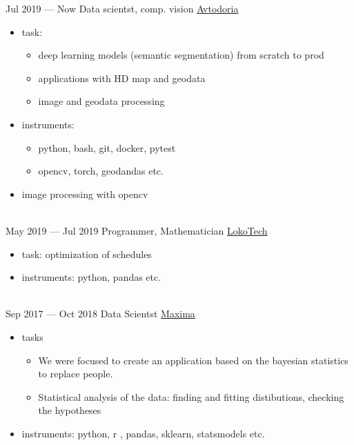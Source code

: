 \documentclass[letterpaper]{twentysecondcv} %
\begin{document}
\begin{twenty} %
        \twentyitem
        {Jul 2019 —}
        {Now}
        {Data scientst, comp. vision}
        {  \href{https://avtodoria.ru/}{Avtodoria}}
        {}
        {
        {\begin{itemize}
            \item task:
            {\begin{itemize}
                \item deep learning models (semantic segmentation) from scratch to prod
                \item applications with HD map and geodata
                \item image and geodata processing
            \end{itemize}}
            \item instruments:
            {\begin{itemize}
                \item python, bash, git, docker, pytest
                \item opencv, torch, geodandas etc.
            \end{itemize}
            }

            \item image processing with opencv
        \end{itemize}}
        }
        \\
        \twentyitem
        {May 2019 —}
        {Jul 2019}
        {Programmer, Mathematician}
        {\href{http://www.locotech.ru/}{LokoTech}}
        {}
        {
        {\begin{itemize}
            \item task: optimization of schedules
            \item instruments: python, pandas etc.
        \end{itemize}}
        }
        \\            
        \twentyitem
        {Sep 2017 —}
        {Oct 2018}
        {Data Scientst}
        {\href{http://maxima.life/}{Maxima}}
        {}
        {
        {\begin{itemize}
            \item tasks
                {\begin{itemize}
                    \item We were focused to create an application based on the bayesian statistics to replace people.
                    \item Statistical analysis of the data: finding and fitting distibutions, checking the hypotheses
                \end{itemize}
                }
            \item instruments: python, r , pandas, sklearn, statsmodels etc.
        \end{itemize}}
        }
\end{twenty}
\end{document}
